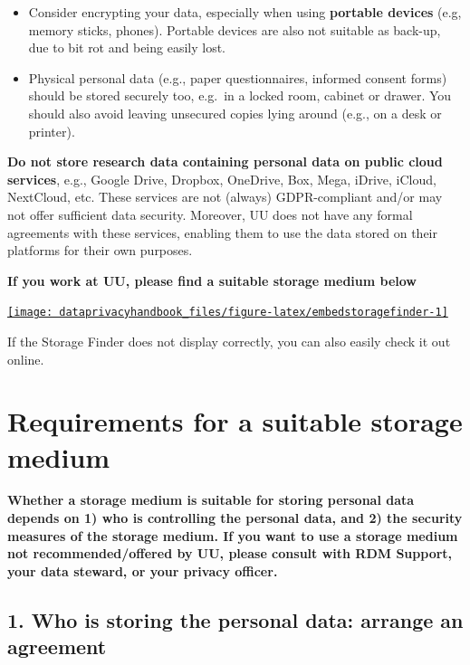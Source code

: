 \documentclass[
]{book}
\providecommand{\tightlist}{%
  \setlength{\itemsep}{0pt}\setlength{\parskip}{0pt}}
\begin{document}
\begin{itemize}
\tightlist
\item
  Consider encrypting your data, especially when using \textbf{portable devices}
  (e.g, memory sticks, phones). Portable devices are also not suitable as back-up,
  due to bit rot and being easily lost.
\item
  Physical personal data (e.g., paper questionnaires, informed consent forms)
  should be stored securely too, e.g.~in a locked room, cabinet or drawer. You
  should also avoid leaving unsecured copies lying around (e.g., on a desk or printer).
\end{itemize}

\textbf{Do not store research data containing personal data on public cloud services},
e.g., Google Drive, Dropbox, OneDrive, Box, Mega, iDrive, iCloud, NextCloud, etc.
These services are not (always) GDPR-compliant and/or may not offer sufficient
data security. Moreover, UU does not have any formal agreements with these
services, enabling them to use the data stored on their platforms for their own
purposes.

\textbf{If you work at UU, please find a suitable storage medium below}

\begin{center}\href{https://tools.uu.nl/storagefinder/}{\texttt{[image: dataprivacyhandbook\_files/figure-latex/embedstoragefinder-1]} }\end{center}

If the Storage Finder does not display correctly, you can also easily
check it out
online.

\hypertarget{data-storage-requirements}{%
\section{Requirements for a suitable storage medium}\label{data-storage-requirements}}

\textbf{Whether a storage medium is suitable for storing personal data depends on 1) who
is controlling the personal data, and 2) the security measures of the storage
medium. If you want to use a storage medium not recommended/offered by UU,
please consult with
RDM Support,
your data steward, or your
privacy officer.}

\hypertarget{who-is-storing-the-personal-data-arrange-an-agreement}{%
\subsection{1. Who is storing the personal data: arrange an agreement}\label{who-is-storing-the-personal-data-arrange-an-agreement}}
\end{document}
